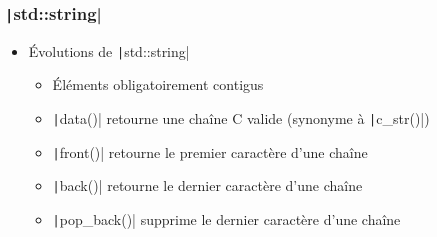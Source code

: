 \documentclass[C++.tex]{subfiles}
\begin{document}
\begin{frame}[fragile]
	\frametitle{\texttt|std::string|}
	\begin{itemize}
		\item Évolutions de \texttt|std::string|
		\begin{itemize}
			\item Éléments obligatoirement contigus
			\item \texttt|data()| retourne une chaîne C valide (synonyme à \texttt|c_str()|)


			\item \texttt|front()| retourne le premier caractère d'une chaîne
			\item \texttt|back()| retourne le dernier caractère d'une chaîne
			\item \texttt|pop_back()| supprime le dernier caractère d'une chaîne
		\end{itemize}
	\end{itemize}
\end{frame}
\end{document}
